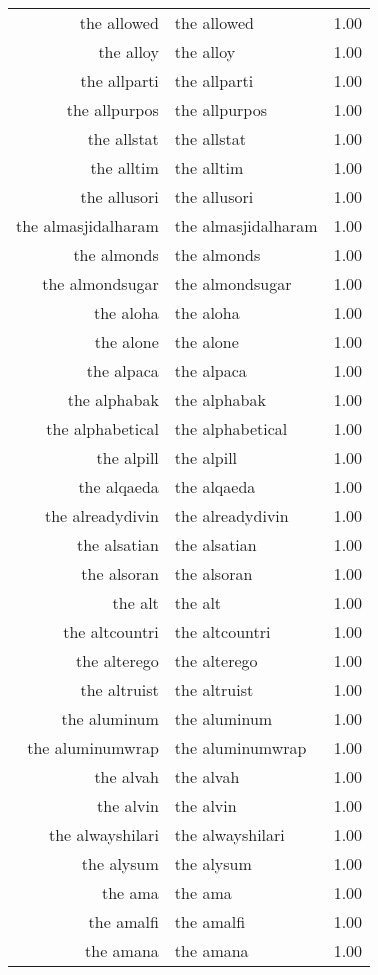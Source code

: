 \begin{table}[ht]
\begin{tabular}{rlr}
  the allowed & the allowed & 1.00 \\ 
  the alloy & the alloy & 1.00 \\ 
  the allparti & the allparti & 1.00 \\ 
  the allpurpos & the allpurpos & 1.00 \\ 
  the allstat & the allstat & 1.00 \\ 
  the alltim & the alltim & 1.00 \\ 
  the allusori & the allusori & 1.00 \\ 
  the almasjidalharam & the almasjidalharam & 1.00 \\ 
  the almonds & the almonds & 1.00 \\ 
  the almondsugar & the almondsugar & 1.00 \\ 
  the aloha & the aloha & 1.00 \\ 
  the alone & the alone & 1.00 \\ 
  the alpaca & the alpaca & 1.00 \\ 
  the alphabak & the alphabak & 1.00 \\ 
  the alphabetical & the alphabetical & 1.00 \\ 
  the alpill & the alpill & 1.00 \\ 
  the alqaeda & the alqaeda & 1.00 \\ 
  the alreadydivin & the alreadydivin & 1.00 \\ 
  the alsatian & the alsatian & 1.00 \\ 
  the alsoran & the alsoran & 1.00 \\ 
  the alt & the alt & 1.00 \\ 
  the altcountri & the altcountri & 1.00 \\ 
  the alterego & the alterego & 1.00 \\ 
  the altruist & the altruist & 1.00 \\ 
  the aluminum & the aluminum & 1.00 \\ 
  the aluminumwrap & the aluminumwrap & 1.00 \\ 
  the alvah & the alvah & 1.00 \\ 
  the alvin & the alvin & 1.00 \\ 
  the alwayshilari & the alwayshilari & 1.00 \\ 
  the alysum & the alysum & 1.00 \\ 
  the ama & the ama & 1.00 \\ 
  the amalfi & the amalfi & 1.00 \\ 
  the amana & the amana & 1.00 \\ 

\end{tabular}
\end{table}
